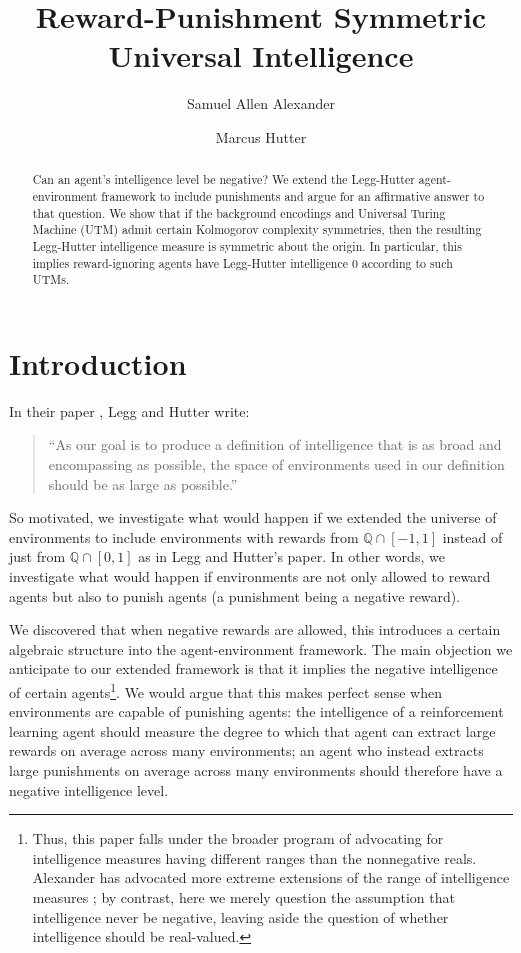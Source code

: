 \documentclass[runningheads]{llncs}
\title{Reward-Punishment Symmetric Universal Intelligence}
\author{Samuel Allen Alexander\inst{1}\orcidID{0000-0002-7930-110X}
\and
Marcus Hutter\inst{2}\orcidID{0000-0002-3263-4097}}
\institute{The U.S.\ Securities and Exchange Commission
\email{samuelallenalexander@gmail.com}
\url{https://philpeople.org/profiles/samuel-alexander/publications}
\and
Google DeepMind
\email{marcus.hutter@anu.edu.au}
\url{http://www.hutter1.net/}
}
\begin{document}
\maketitle

\begin{abstract}
    Can an agent's intelligence level be negative?
    We extend the Legg-Hutter agent-environment framework to include punishments
    and argue for an affirmative answer to that question.
    We show that if the background encodings and Universal Turing Machine (UTM) admit
    certain Kolmogorov complexity symmetries,
    then the resulting Legg-Hutter intelligence measure is symmetric about
    the origin. In particular, this implies reward-ignoring agents
    have Legg-Hutter intelligence $0$ according to such UTMs.
\end{abstract}

\section{Introduction}

In their paper \cite{legg2007universal}, Legg and Hutter write:
\begin{quote}
    ``As our goal is to produce a definition of intelligence that is as broad and
    encompassing as possible, the space of environments used in our definition should
    be as large as possible.''
\end{quote}
So motivated, we investigate what would happen if we extended the universe
of environments to include environments with rewards from $\mathbb Q\cap [-1,1]$
instead of just from $\mathbb Q\cap [0,1]$ as in Legg and Hutter's paper.
In other words, we investigate what would happen if environments are not only
allowed to reward agents but also to punish agents (a punishment being a negative
reward).

We discovered that when negative rewards are allowed, this
introduces a certain algebraic structure into the agent-environment framework. The
main objection we anticipate to our extended framework
is that it implies the negative intelligence of certain
agents\footnote{Thus, this paper falls under the broader
program of advocating for intelligence measures having different ranges than
the nonnegative reals. Alexander has advocated
more extreme extensions of the range of intelligence measures
\cite{alexander2020archimedean} \cite{alexander2021measuring}; by contrast,
here we merely question the
assumption that intelligence never be negative, leaving aside the
question of whether intelligence should be real-valued.}.
We would argue that this makes perfect sense when environments are capable of punishing
agents: the intelligence of a reinforcement learning agent should measure the
degree to which that agent can extract large rewards on average across many environments;
an agent who instead extracts large punishments on average across many environments
should therefore have a negative intelligence level.
\end{document}
